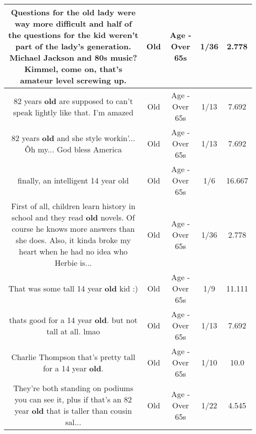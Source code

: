 \documentclass[11pt]{article}
\newlength\mylength
\begin{document}
\begin{center}
\begin{longtable}{|C{.65\mylength}|C{.30\mylength}|C{.12\mylength}|C{.12\mylength}|C{.12\mylength}|}
  \small Questions for the \textbf{old} lady were way more difficult and half of the questions for the kid weren't part of the lady's generation. Michael Jackson and 80s music? Kimmel, come on, that's amateur level screwing up.\normalsize   & Old & Age - Over 65s & 1/36 & 2.778 \\  \hline
  \small 82 years \textbf{old} are supposed to can't speak lightly like that. I'm amazed\normalsize   & Old & Age - Over 65s & 1/13 & 7.692 \\  \hline
  \small 82 years \textbf{old} and she style workin'... Ôh my... God bless America   \normalsize   & Old & Age - Over 65s & 1/13 & 7.692 \\  \hline
  \small finally, an intelligent 14 year old\normalsize   & Old & Age - Over 65s & 1/6 & 16.667 \\  \hline
  \small First of all, children learn history in school and they read \textbf{old} novels. Of course he knows more answers than she does. Also, it kinda broke my heart when he had no idea who Herbie is...\normalsize   & Old & Age - Over 65s & 1/36 & 2.778 \\  \hline
  \small That was some tall 14 year \textbf{old} kid  :)\normalsize   & Old & Age - Over 65s & 1/9 & 11.111 \\  \hline
  \small thats good for a 14 year \textbf{old}. but not tall at all. lmao\normalsize   & Old & Age - Over 65s & 1/13 & 7.692 \\  \hline
  \small Charlie Thompson that's pretty tall for a 14 year \textbf{old}.\normalsize   & Old & Age - Over 65s & 1/10 & 10.0 \\  \hline
  \small They're both standing on podiums you can see it, plus if that's an 82 year \textbf{old} that is taller than cousin sal...\normalsize   & Old & Age - Over 65s & 1/22 & 4.545 \\  \hline

\end{longtable}
\end{center}
\end{document}
